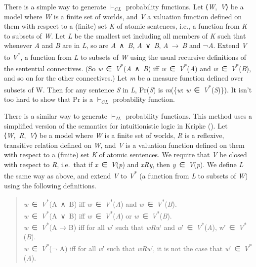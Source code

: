 \documentclass[
  10pt,
  letterpaper,
  DIV=11,
  numbers=noendperiod,
  twoside]{scrartcl}
\begin{document}
There is a simple way to generate \(\vdash_{CL}\) probability functions.
Let ⟨\emph{W},~\emph{V}⟩ be a model where \emph{W} is a finite set of
worlds, and \emph{V} a valuation function defined on them with respect
to a (finite) set \emph{K} of atomic sentences, i.e., a function from
\emph{K} to subsets of \emph{W}. Let \emph{L} be the smallest set
including all members of \emph{K} such that whenever \emph{A} and
\emph{B} are in \emph{L}, so are \emph{A}~∧~\emph{B},
\emph{A}~∨~\emph{B}, \emph{A}~→~\emph{B} and ¬\emph{A}. Extend \emph{V}
to \emph{V}\textsuperscript{*}, a function from \emph{L} to subsets of
\emph{W} using the usual recursive definitions of the sentential
connectives. (So
\emph{w}~∈~\emph{V}\textsuperscript{*}(\emph{A}~∧~\emph{B}) iff
\emph{w}~∈~\emph{V}\textsuperscript{*}(\emph{A}) and
\emph{w}~∈~\emph{V}\textsuperscript{*}(\emph{B}), and so on for the
other connectives.) Let \emph{m} be a measure function defined over
subsets of W. Then for any sentence \emph{S} in \emph{L}, Pr(\emph{S})
is \emph{m}(\{\emph{w}:
\emph{w}~∈~\emph{V}\textsuperscript{*}(\emph{S})\}). It isn't too hard
to show that Pr is a \(\vdash_{CL}\) probability function.

There is a similar way to generate \(\vdash_{IL}\) probability
functions. This method uses a simplified version of the semantics for
intuitionistic logic in Kripke (). Let
⟨\emph{W},~\emph{R},~\emph{V}⟩ be a model where \emph{W} is a finite set
of worlds, \emph{R} is a reflexive, transitive relation defined on
\emph{W}, and \emph{V} is a valuation function defined on them with
respect to a (finite) set \emph{K} of atomic sentences. We require that
\emph{V} be closed with respect to \emph{R}, i.e.~that if
\emph{x}~∈~\emph{V}(\emph{p}) and \emph{xRy}, then
\emph{y}~∈~\emph{V}(\emph{p}). We define \emph{L} the same way as above,
and extend \emph{V} to \emph{V}\textsuperscript{*} (a function from
\emph{L} to subsets of \emph{W}) using the following definitions.

\begin{quote}
\emph{w}~∈~\emph{V}\textsuperscript{*}(A~∧~B) iff
\emph{w}~∈~\emph{V}\textsuperscript{*}(\emph{A}) and
\emph{w}~∈~\emph{V}\textsuperscript{*}(\emph{B}).\\
\emph{w}~∈~\emph{V}\textsuperscript{*}(A~∨~B) iff
\emph{w}~∈~\emph{V}\textsuperscript{*}(\emph{A}) or
\emph{w}~∈~\emph{V}\textsuperscript{*}(\emph{B}).\\
\emph{w}~∈~\emph{V}\textsuperscript{*}(A → B) iff for all \emph{w}′ such
that \emph{wRw}′ and \emph{w}′~∈~\emph{V}\textsuperscript{*}(\emph{A}),
w′~∈~\emph{V}\textsuperscript{*}(\emph{B}).\\
\emph{w}~∈~\emph{V}\textsuperscript{*}(¬ A) iff for all \emph{w}′ such
that \emph{wRw}′, it is not the case that
\emph{w}′~∈~\emph{V}\textsuperscript{*}(\emph{A}).
\end{quote}
\end{document}
